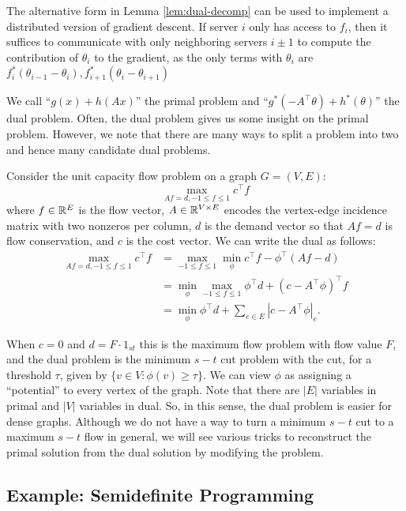 \begin{rem*}
The alternative form in Lemma \ref{lem:dual-decomp} can be used to
implement a distributed version of gradient descent. If server $i$
only has access to $f_{i}$, then it suffices to communicate with
only neighboring servers $i\pm1$ to compute the contribution of $\theta_{i}$
to the gradient, as the only terms with $\theta_{i}$ are $f^{*}_{i}(\theta_{i-1}-\theta_{i}),f^{*}_{i+1}(\theta_{i}-\theta_{i+1})$
\end{rem*}
We call ``$g(x)+h(Ax)$'' the primal problem and ``$g^{*}(-A^{\top}\theta)+h^{*}(\theta)$''
the dual problem. Often, the dual problem gives us some insight on
the primal problem. However, we note that there are many ways to split
a problem into two and hence many candidate dual problems.
\begin{example}
Consider the unit capacity flow problem on a graph $G=(V,E)$:
\[
\max_{Af=d,-1\leq f\leq1}c^{\top}f
\]
where $f\in\mathbb{R}^{E}$ is the flow vector, $A\in\mathbb{R}^{V\times E}$ encodes
the vertex-edge incidence matrix with two nonzeros per column, $d$
is the demand vector so that $Af=d$ is flow conservation, and $c$
is the cost vector. We can write the dual as follows:
\begin{align*}
\max_{Af=d,-1\leq f\leq1}c^{\top}f & =\max_{-1\leq f\leq1}\min_{\phi}c^{\top}f-\phi^{\top}(Af-d)\\
 & =\min_{\phi}\max_{-1\leq f\leq1}\phi^{\top}d+(c-A^{\top}\phi)^{\top}f\\
 & =\min_{\phi}\phi^{\top}d+\sum_{e\in E}|c-A^{\top}\phi|_{e}.
\end{align*}
\end{example}

When $c=0$ and $d=F\cdot1_{st}$ this is the maximum flow problem
with flow value $F$, and the dual problem is the minimum $s-t$ cut
problem with the cut, for a threshold $\tau$, given by $\{v\in V:\phi(v)\geq\tau\}$.
We can view $\phi$ as assigning a ``potential'' to every vertex
of the graph. Note that there are $|E|$ variables in primal and $|V|$
variables in dual. So, in this sense, the dual problem is easier for
dense graphs. Although we do not have a way to turn a minimum $s-t$
cut to a maximum $s-t$ flow in general, we will see various tricks
to reconstruct the primal solution from the dual solution by modifying
the problem.

\subsection{Example: Semidefinite Programming}

